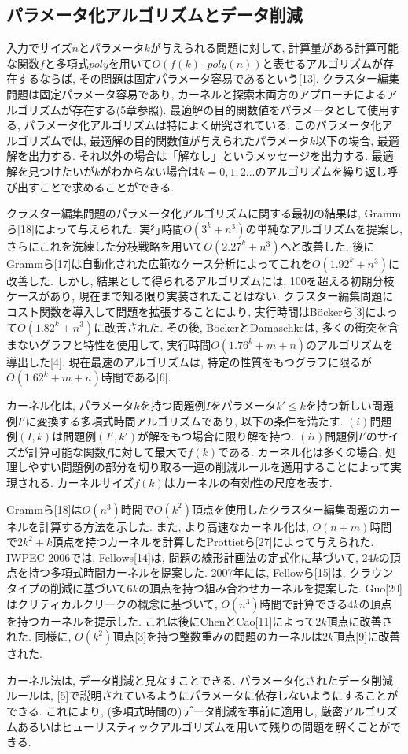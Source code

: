 \documentclass[10.5,a4paper,titlepage, dvipdfmx]{bxjsarticle}
\begin{document}
\subsection{パラメータ化アルゴリズムとデータ削減}
入力でサイズ$n$とパラメータ$k$が与えられる問題に対して, 計算量がある計算可能な関数$f$と多項式$poly$を用いて$O(f(k) \cdot poly(n))$と表せるアルゴリズムが存在するならば, その問題は固定パラメータ容易であるという[13].
クラスター編集問題は固定パラメータ容易であり, カーネルと探索木両方のアプローチによるアルゴリズムが存在する(5章参照).
最適解の目的関数値をパラメータとして使用する, パラメータ化アルゴリズムは特によく研究されている.
このパラメータ化アルゴリズムでは, 最適解の目的関数値が与えられたパラメータ$k$以下の場合, 最適解を出力する.
それ以外の場合は「解なし」というメッセージを出力する.
最適解を見つけたいが$k$がわからない場合は$k=0,1,2...$のアルゴリズムを繰り返し呼び出すことで求めることができる.\par
クラスター編集問題のパラメータ化アルゴリズムに関する最初の結果は, Grammら[18]によって与えられた.
実行時間$O(3^k+n^3)$の単純なアルゴリズムを提案し, さらにこれを洗練した分枝戦略を用いて$O(2.27^k+n^3)$へと改善した.
後にGrammら[17]は自動化された広範なケース分析によってこれを$O(1.92^k+n^3)$に改善した.
しかし, 結果として得られるアルゴリズムには, 100を超える初期分枝ケースがあり, 現在まで知る限り実装されたことはない.
クラスター編集問題にコスト関数を導入して問題を拡張することにより, 実行時間はBöckerら[3]によって$O(1.82^k+n^3)$に改善された.
その後, BöckerとDamaschkeは, 多くの衝突を含まないグラフと特性を使用して, 実行時間$O(1.76^k+m+n)$のアルゴリズムを導出した[4].
現在最速のアルゴリズムは, 特定の性質をもつグラフに限るが$O(1.62^k+m+n)$時間である[6].\par
カーネル化は, パラメータ$k$を持つ問題例$I$をパラメータ$k' \le k$を持つ新しい問題例$I'$に変換する多項式時間アルゴリズムであり, 以下の条件を満たす.
$(i)$問題例$(I,k)$は問題例$(I',k')$が解をもつ場合に限り解を持つ.
$(ii)$問題例$I'$のサイズが計算可能な関数$f$に対して最大で$f(k)$である.
カーネル化は多くの場合, 処理しやすい問題例の部分を切り取る一連の削減ルールを適用することによって実現される.
カーネルサイズ$f(k)$はカーネルの有効性の尺度を表す.\par
Grammら[18]は$O(n^3)$時間で$O(k^2)$頂点を使用したクラスター編集問題のカーネルを計算する方法を示した.
また, より高速なカーネル化は, $O(n+m)$時間で$2k^2+k$頂点を持つカーネルを計算したProttietら[27]によって与えられた.
IWPEC 2006では, Fellows[14]は, 問題の線形計画法の定式化に基づいて, $24k$の頂点を持つ多項式時間カーネルを提案した.
2007年には, Fellowら[15]は, クラウンタイプの削減に基づいて$6k$の頂点を持つ組み合わせカーネルを提案した.
Guo[20]はクリティカルクリークの概念に基づいて, $O(n^3)$時間で計算できる$4k$の頂点を持つカーネルを提示した.
これは後にChenとCao[11]によって$2k$頂点に改善された.
同様に, $O(k^2)$頂点[3]を持つ整数重みの問題のカーネルは$2k$頂点[9]に改善された.\par
カーネル法は, データ削減と見なすことできる.
パラメータ化されたデータ削減ルールは, [5]で説明されているようにパラメータに依存しないようにすることができる.
これにより, (多項式時間の)データ削減を事前に適用し, 厳密アルゴリズムあるいはヒューリスティックアルゴリズムを用いて残りの問題を解くことができる.
\end{document}
